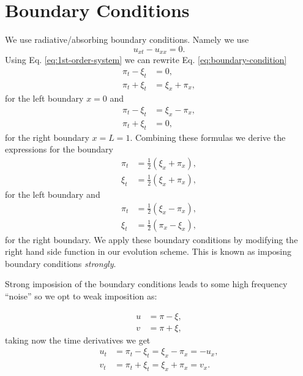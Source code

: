 \documentclass[reprint, prd, nofootinbib, superscriptaddress, floatfix]{revtex4-2}  %
\begin{document}
\section{Boundary Conditions}
We use radiative/absorbing boundary conditions. Namely we use
\begin{equation}
  \label{eq:boundary-condition}
  u_{xt} - u_{xx} = 0.
\end{equation}
Using Eq. \ref{eq:1st-order-system} we can rewrite Eq. \ref{eq:boundary-condition}
\begin{align}
  \label{eq:bc-left}
  \pi_t - \xi_t &= 0, \\
  \pi_t + \xi_t &= \xi_x + \pi_x,
\end{align}
for the left boundary $x=0$ and
\begin{align}
  \label{eq:bc-right}
  \pi_t - \xi_t &= \xi_x - \pi_x, \\
  \pi_t + \xi_t &= 0,
\end{align}
for the right boundary $x=L=1$. Combining these formulas we derive the expressions for the boundary
\begin{equation}
  \label{eq:rhs-bc-left}
  \begin{split}
    \pi_t &= \frac{1}{2} (\xi_x + \pi_x), \\
    \xi_t &= \frac{1}{2} (\xi_x + \pi_x),
  \end{split}
\end{equation}
for the left boundary and
\begin{equation}
  \label{eq:rhs-bc-right}
  \begin{split}
    \pi_t &= \frac{1}{2} (\xi_x - \pi_x), \\
    \xi_t &= \frac{1}{2} (\pi_x - \xi_x),
  \end{split}
\end{equation}
for the right boundary. We apply these boundary conditions by modifying the right hand side function in our evolution scheme. This is known as imposing boundary conditions \textit{strongly}.

Strong imposision of the boundary conditions leads to some high frequency ``noise'' so we opt to weak imposition as:

\begin{align}
  u &= \pi - \xi,  \label{eq:characteristic_vars1} \\
  v &= \pi + \xi,   \label{eq:characteristic_vars2}
\end{align}
taking now the time derivatives we get
\begin{align}
  \label{eq:left_boundary_1}
  u_t &= \pi_t - \xi_t = \xi_x - \pi_x = -u_x, \\
  v_t &= \pi_t + \xi_t = \xi_x + \pi_x = v_x.
\end{align}
\end{document}
